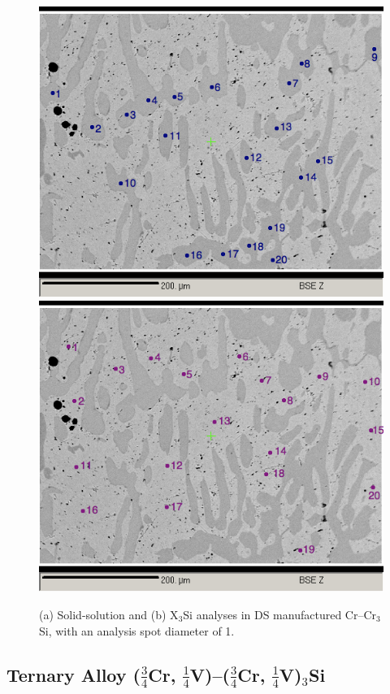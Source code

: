 \begin{figure}[H]
\begin{center}
\includegraphics[width=12.5cm]{location171crrfX3Sipoints} 
\includegraphics[width=12.5cm]{location171crrfpointsSS}
\caption{(a) Solid-solution and (b) X$_3$Si analyses in DS manufactured Cr--Cr$_3$Si, with an analysis spot diameter of 1\micro\metre.}
\label{fig:location171crrfpointsSS}
\end{center}
\end{figure}
%
\subsection{Ternary Alloy ($\frac{3}{4}$Cr, $\frac{1}{4}$V)--($\frac{3}{4}$Cr, $\frac{1}{4}$V)$_3$Si}


